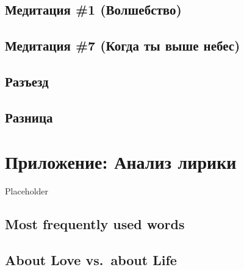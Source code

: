 \documentclass[
]{article}
\begin{document}
\hypertarget{ux43cux435ux434ux438ux442ux430ux446ux438ux44f-1-ux432ux43eux43bux448ux435ux431ux441ux442ux432ux43e}{%
\subsection*{Медитация \#1 (Волшебство)}\label{ux43cux435ux434ux438ux442ux430ux446ux438ux44f-1-ux432ux43eux43bux448ux435ux431ux441ux442ux432ux43e}}

\hypertarget{ux43cux435ux434ux438ux442ux430ux446ux438ux44f-7-ux43aux43eux433ux434ux430-ux442ux44b-ux432ux44bux448ux435-ux43dux435ux431ux435ux441}{%
\subsection*{Медитация \#7 (Когда ты выше небес)}\label{ux43cux435ux434ux438ux442ux430ux446ux438ux44f-7-ux43aux43eux433ux434ux430-ux442ux44b-ux432ux44bux448ux435-ux43dux435ux431ux435ux441}}

\hypertarget{ux440ux430ux437ux44aux435ux437ux434}{%
\subsection*{Разъезд}\label{ux440ux430ux437ux44aux435ux437ux434}}

\hypertarget{ux440ux430ux437ux43dux438ux446ux430}{%
\subsection*{Разница}\label{ux440ux430ux437ux43dux438ux446ux430}}

\hypertarget{TextMining}{%
\section*{Приложение: Анализ лирики}\label{TextMining}}

Placeholder

\hypertarget{most-frequently-used-words}{%
\subsection*{Most frequently used words}\label{most-frequently-used-words}}

\hypertarget{about-love-vs.-about-life}{%
\subsection*{About Love vs.~about Life}\label{about-love-vs.-about-life}}
\end{document}
